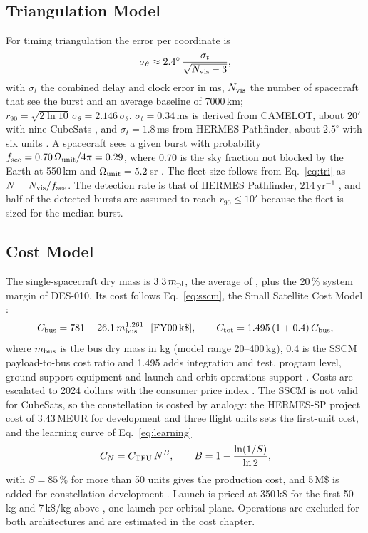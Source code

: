 \subsection{Triangulation Model}

For timing triangulation the error per coordinate is \cite{Fiore2020}
\begin{equation}\label{eq:tri}
\sigma_\theta \approx 2.4^\circ\,\frac{\sigma_t}{\sqrt{N_{\rm vis}-3}},
\end{equation}
with $\sigma_t$ the combined delay and clock error in ms, $N_{\rm vis}$ the number of
spacecraft that see the burst and an average baseline of 7000\,km;
$r_{90}=\sqrt{2\ln10}\,\sigma_\theta=2.146\,\sigma_\theta$. $\sigma_t=0.34$\,ms is derived
from CAMELOT, about $20'$ with nine CubeSats \cite{Werner2018}, and $\sigma_t=1.8$\,ms from
HERMES Pathfinder, about $2.5^\circ$ with six units \cite{Fiore2020}. A spacecraft sees a
given burst with probability $f_{\rm see}=0.70\,\Omega_{\rm unit}/4\pi=0.29$, where 0.70 is
the sky fraction not blocked by the Earth at 550\,km and $\Omega_{\rm unit}=5.2$\,sr
\cite{Ghirlanda2024}. The fleet size follows from Eq.~\eqref{eq:tri} as
$N=N_{\rm vis}/f_{\rm see}$. The detection rate is that of HERMES Pathfinder,
$214\,\mathrm{yr^{-1}}$ \cite{Ghirlanda2024}, and half of the detected bursts are assumed
to reach $r_{90}\le10'$ because the fleet is sized for the median burst.

\subsection{Cost Model}

The single-spacecraft dry mass is $3.3\,m_{\rm pl}$, the average of
\cite[Table~10-6, p.~312]{Wertz1999}, plus the 20\,\% system margin of DES-010. Its cost
follows Eq.~\eqref{eq:sscm}, the Small Satellite Cost Model \cite[Table~20-6, p.~797]{Wertz1999}:
\begin{equation}\label{eq:sscm}
C_{\rm bus} = 781 + 26.1\,m_{\rm bus}^{1.261}\ \ [\mathrm{FY00\,k\$}],\qquad
C_{\rm tot} = 1.495\,(1+0.4)\,C_{\rm bus},
\end{equation}
where $m_{\rm bus}$ is the bus dry mass in kg (model range 20--400\,kg), 0.4 is the SSCM
payload-to-bus cost ratio and 1.495 adds integration and test, program level, ground support
equipment and launch and orbit operations support \cite[p.~797]{Wertz1999}. Costs are
escalated to 2024 dollars with the consumer price index \cite{BLSCPI}. The SSCM is not valid
for CubeSats, so the constellation is costed by analogy: the HERMES-SP project cost of
3.43\,MEUR for development and three flight units \cite{CORDIS821896} sets the first-unit
cost, and the learning curve of Eq.~\eqref{eq:learning}
\begin{equation}\label{eq:learning}
C_N = C_{\rm TFU}\,N^{B},\qquad B = 1-\frac{\ln(1/S)}{\ln 2},
\end{equation}
with $S=85\,\%$ for more than 50 units \cite[Eq.~20-5, p.~809]{Wertz1999} gives the
production cost, and 5\,M\$ is added for constellation development \cite{Garcia2021}.
Launch is priced at 350\,k\$ for the first 50\,kg and 7\,k\$/kg above
\cite{SpaceXRideshare}, one launch per orbital plane. Operations are excluded for both
architectures and are estimated in the cost chapter.


